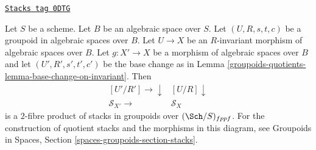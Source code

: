 \begin{lemma}
\label{groupoids-quotients-lemma-base-change-quotient-stack}
\href{https://stacks.math.columbia.edu/tag/0DTG}{\texttt{Stacks tag 0DTG}}

Let $S$ be a scheme. Let $B$ be an algebraic space over $S$.
Let $(U, R, s, t, c)$ be a groupoid in algebraic spaces over $B$.
Let $U \to X$ be an $R$-invariant morphism of algebraic spaces over
$B$. Let $g : X' \to X$ be a morphism of algebraic spaces over $B$
and let $(U', R', s', t', c')$ be the base change as in
Lemma \ref{groupoids-quotients-lemma-base-change-on-invariant}. Then
$$
\begin{array}{cc}[U'/R'] \longrightarrow\downarrow & [U/R] \downarrow \\ \mathcal{S}_{X'} \longrightarrow & \mathcal{S}_X\end{array}
$$
is a $2$-fibre product of stacks in groupoids over $(\Sch/S)_{fppf}$.
For the construction of quotient stacks and the morphisms in this
diagram, see
Groupoids in Spaces, Section \ref{spaces-groupoids-section-stacks}.
\end{lemma}

